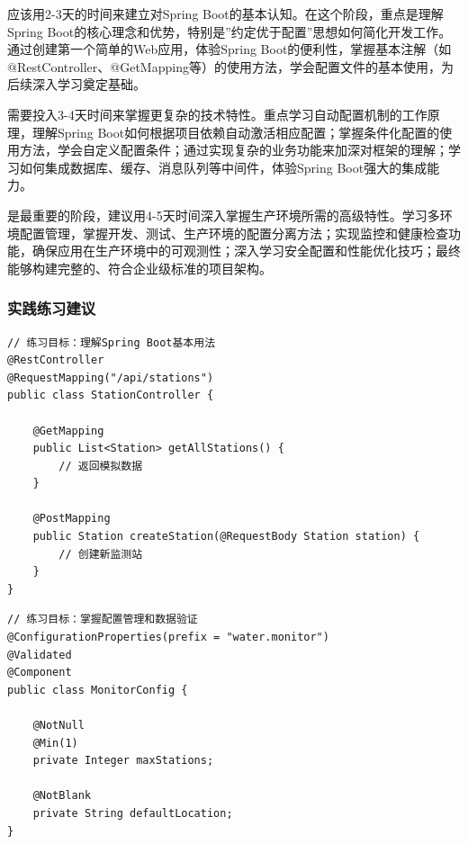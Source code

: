 应该用2-3天的时间来建立对Spring Boot的基本认知。在这个阶段，重点是理解Spring Boot的核心理念和优势，特别是''约定优于配置''思想如何简化开发工作。通过创建第一个简单的Web应用，体验Spring Boot的便利性，掌握基本注解（如@RestController、@GetMapping等）的使用方法，学会配置文件的基本使用，为后续深入学习奠定基础。

需要投入3-4天时间来掌握更复杂的技术特性。重点学习自动配置机制的工作原理，理解Spring Boot如何根据项目依赖自动激活相应配置；掌握条件化配置的使用方法，学会自定义配置条件；通过实现复杂的业务功能来加深对框架的理解；学习如何集成数据库、缓存、消息队列等中间件，体验Spring Boot强大的集成能力。

是最重要的阶段，建议用4-5天时间深入掌握生产环境所需的高级特性。学习多环境配置管理，掌握开发、测试、生产环境的配置分离方法；实现监控和健康检查功能，确保应用在生产环境中的可观测性；深入学习安全配置和性能优化技巧；最终能够构建完整的、符合企业级标准的项目架构。

\hypertarget{ux5b9eux8df5ux7ec3ux4e60ux5efaux8bae-1}{%
\subsubsection{实践练习建议}\label{ux5b9eux8df5ux7ec3ux4e60ux5efaux8bae-1}}

\begin{lstlisting}[style=java]
// 练习目标：理解Spring Boot基本用法
@RestController
@RequestMapping("/api/stations")
public class StationController {
    
    @GetMapping
    public List<Station> getAllStations() {
        // 返回模拟数据
    }
    
    @PostMapping
    public Station createStation(@RequestBody Station station) {
        // 创建新监测站
    }
}
\end{lstlisting}

\begin{lstlisting}[style=java]
// 练习目标：掌握配置管理和数据验证
@ConfigurationProperties(prefix = "water.monitor")
@Validated
@Component
public class MonitorConfig {
    
    @NotNull
    @Min(1)
    private Integer maxStations;
    
    @NotBlank
    private String defaultLocation;
}
\end{lstlisting}


